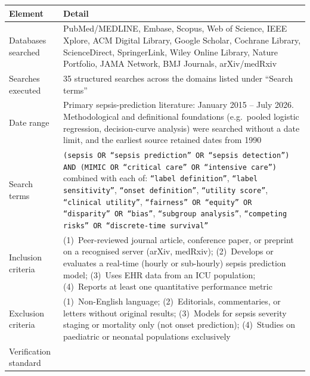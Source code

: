 \begin{table}[H]
    \centering\small
    \begin{tabular}{p{3.2cm}p{9.5cm}}
        \toprule
        \textbf{Element} & \textbf{Detail} \\
        \midrule
        Databases searched &
        PubMed/MEDLINE, Embase, Scopus, Web of Science, IEEE Xplore,
        ACM Digital Library, Google Scholar, Cochrane Library,
        ScienceDirect, SpringerLink, Wiley Online Library, Nature
        Portfolio, JAMA Network, BMJ Journals, arXiv/medRxiv \\
        \addlinespace
        Searches executed &
        35 structured searches across the domains listed under ``Search
        terms'' \\
        \addlinespace
        Date range &
        Primary sepsis-prediction literature: January 2015 -- July 2026.
        Methodological and definitional foundations (e.g.\ pooled logistic
        regression, decision-curve analysis) were searched without a date
        limit, and the earliest source retained dates from 1990 \\
        \addlinespace
        Search terms &
        \texttt{(sepsis OR ``sepsis prediction'' OR ``sepsis detection'') AND
            (MIMIC OR ``critical care'' OR ``intensive care'')} combined with each
        of: \texttt{``label definition''}, \texttt{``label sensitivity''},
        \texttt{``onset definition''}, \texttt{``utility score''},
        \texttt{``clinical utility''}, \texttt{``fairness'' OR ``equity'' OR
        ``disparity'' OR ``bias''}, \texttt{``subgroup analysis''},
        \texttt{``competing risks'' OR ``discrete-time survival''} \\
        \addlinespace
        Inclusion criteria &
        (1)~Peer-reviewed journal article, conference paper, or preprint on a
        recognised server (arXiv, medRxiv);
        (2)~Develops or evaluates a real-time (hourly or sub-hourly) sepsis
        prediction model;
        (3)~Uses EHR data from an ICU population;
        (4)~Reports at least one quantitative performance metric \\
        \addlinespace
        Exclusion criteria &
        (1)~Non-English language;
        (2)~Editorials, commentaries, or letters without original results;
        (3)~Models for sepsis severity staging or mortality only (not onset
        prediction);
        (4)~Studies on paediatric or neonatal populations exclusively \\
        \addlinespace
        Verification standard &

\end{tabular}
\end{table}
